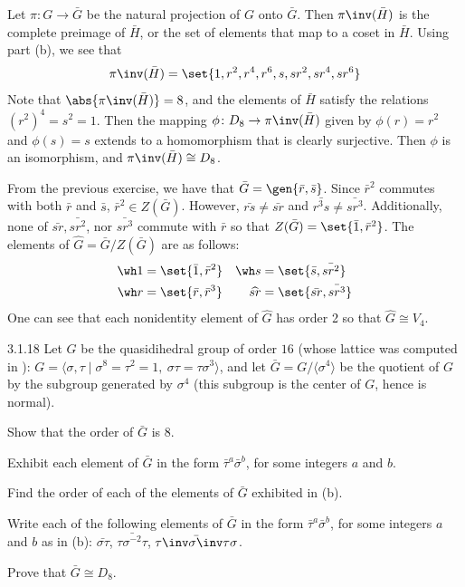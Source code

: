 \begin{solenum}
    Let $\pi \colon G \to \bar G$ be the natural projection of $G$ onto $\bar G$.
	Then $\pi\inv(\bar H)$ is the complete preimage of $\bar H$, or the set of elements that map to a coset in $\bar H$.
	Using part (b), we see that
    \[
    	\pi\inv(\bar H) = \set{1, r^2, r^4, r^6, s, sr^2, sr^4, sr^6}
    \]
    Note that $\abs{\pi\inv(\bar H)} = 8$, and the elements of $\bar H$ satisfy the relations $(r^2)^4 = s^2 = 1$.
	Then the mapping $\phi \colon D_8 \to \pi\inv(\bar H)$ given by $\phi(r) = r^2$ and $\phi(s) = s$ extends to a homomorphism that is clearly surjective.
	Then $\phi$ is an isomorphism, and $\pi\inv(\bar H) \cong D_8$.
    \item From the previous exercise, we have that $\bar G = \gen{\bar r, \bar s}$.
	Since $\bar r^2$ commutes with both $\bar r$ and $\bar s$, $\bar r^2 \in Z(\bar G)$.
	However, $\bar{rs} \neq \bar{sr}$ and $\bar{r^3s} \neq \bar{sr^3}$.
	Additionally, none of $\bar{sr}, \bar{sr^2}$, nor $\bar{sr^3}$ commute with $\bar r$ so that $Z(\bar G) = \set{\bar 1, \bar r^2}$.
	The elements of $\widehat G = \bar G/Z(\bar G)$ are as follows:
    \begin{align*}
        \wh 1 & = \set{\bar 1, \bar r^2} & \wh s & = \set{\bar s, \bar{sr^2}} \\
        \wh r & = \set{\bar r, \bar r^3} & \widehat{sr} & = \set{\bar{sr}, \bar{sr^3}}
    \end{align*}
    One can see that each nonidentity element of $\widehat G$ has order 2 so that $\widehat G \cong V_4$.
\end{solenum}

\begin{exercise}{3.1.18}
    Let $G$ be the quasidihedral group of order $16$ (whose lattice was computed in ): $G = \langle \sigma,\tau \mid \sigma^8 = \tau^2 = 1,\ \sigma\tau = \tau\sigma^3 \rangle$, and let $\bar{G} = G/\langle \sigma^4 \rangle$ be the quotient of $G$ by the subgroup generated by $\sigma^4$ (this subgroup is the center of $G$, hence is normal).
    \begin{subexercises}
        \item Show that the order of $\bar{G}$ is $8$.
        \item Exhibit each element of $\bar{G}$ in the form $\bar{\tau}^a \bar{\sigma}^b$, for some integers $a$ and $b$.
        \item Find the order of each of the elements of $\bar{G}$ exhibited in (b).
        \item Write each of the following elements of $\bar{G}$ in the form $\bar{\tau}^a \bar{\sigma}^b$, for some integers $a$ and $b$ as in (b): $\bar{\sigma\tau}$, $\bar{\tau\sigma^{-2}\tau}$, $\bar{\tau\inv \sigma\inv \tau\sigma}$.
        \item Prove that $\bar{G} \cong D_8$.
    \end{subexercises}
\end{exercise}

